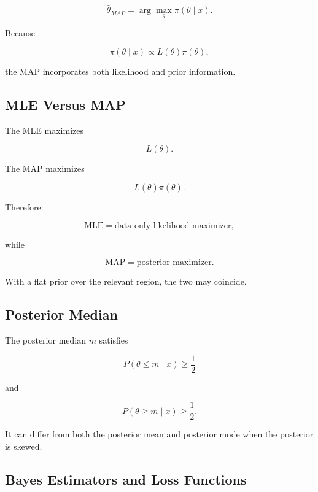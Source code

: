 \[
\boxed{
\widehat{\theta}_{MAP}
=
\arg\max_\theta
\pi(\theta\mid x).
}
\]

Because

\[
\pi(\theta\mid x)
\propto
L(\theta)\pi(\theta),
\]

the MAP incorporates both likelihood and prior information.

\subsection{MLE Versus MAP}
\label{subsec:mle-versus-map}

The MLE maximizes

\[
\boxed{
L(\theta).
}
\]

The MAP maximizes

\[
\boxed{
L(\theta)\pi(\theta).
}
\]

Therefore:

\[
\boxed{
\text{MLE}
=
\text{data-only likelihood maximizer},
}
\]

while

\[
\boxed{
\text{MAP}
=
\text{posterior maximizer}.
}
\]

With a flat prior over the relevant region, the two may coincide.

\subsection{Posterior Median}
\label{subsec:posterior-median}

The posterior median \(m\) satisfies

\[
\boxed{
P(\theta\leq m\mid x)
\geq
\frac12
}
\]

and

\[
\boxed{
P(\theta\geq m\mid x)
\geq
\frac12.
}
\]

It can differ from both the posterior mean and posterior mode when the
posterior is skewed.

\subsection{Bayes Estimators and Loss Functions}
\label{subsec:bayes-estimators-loss}

